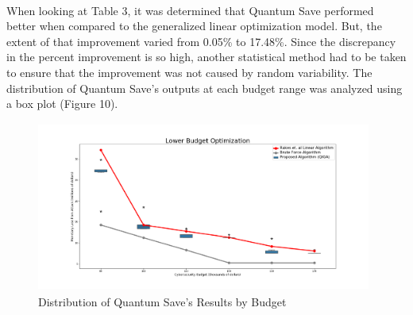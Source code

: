 \begin{singlespace}
\vspace*{0.6cm}
\begin{table}[H]
    \centering
    \caption{Percent Improvement by Quantum Save}
    \label{parametri}
\end{table}
\end{singlespace}
 \\

When looking at Table 3, it was determined that Quantum Save performed better when compared to the generalized linear optimization model. But, the extent of that improvement varied from 0.05\% to 17.48\%. Since the discrepancy in the percent improvement is so high, another statistical method had to be taken to ensure that the improvement was not caused by random variability. The distribution of Quantum Save's outputs at each budget range was analyzed using a box plot (Figure 10).

\begin{figure}[ht]%
\centering
\includegraphics[width=11cm,height=5.6cm]{Images/boxplot.png}
\caption{Distribution of Quantum Save's Results by Budget}%
\end{figure}


